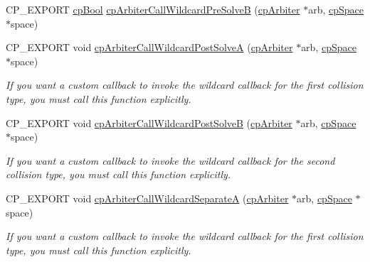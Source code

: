 \begin{DoxyCompactItemize}
\item 
C\+P\+\_\+\+E\+X\+P\+O\+RT \mbox{\hyperlink{group__basic_types_gabc5e752c48f3449ca26ef413ecbd647e}{cp\+Bool}} \mbox{\hyperlink{group__cp_arbiter_ga61954fc86039826a56e504f483ebe8a6}{cp\+Arbiter\+Call\+Wildcard\+Pre\+SolveB}} (\mbox{\hyperlink{structcp_arbiter}{cp\+Arbiter}} $\ast$arb, \mbox{\hyperlink{structcp_space}{cp\+Space}} $\ast$space)
\item 
\mbox{\label{group__cp_arbiter_gab5cc72090ced7919e12768dcee35e046}} 
C\+P\+\_\+\+E\+X\+P\+O\+RT void \mbox{\hyperlink{group__cp_arbiter_gab5cc72090ced7919e12768dcee35e046}{cp\+Arbiter\+Call\+Wildcard\+Post\+SolveA}} (\mbox{\hyperlink{structcp_arbiter}{cp\+Arbiter}} $\ast$arb, \mbox{\hyperlink{structcp_space}{cp\+Space}} $\ast$space)
\begin{DoxyCompactList}\small\item\em If you want a custom callback to invoke the wildcard callback for the first collision type, you must call this function explicitly. \end{DoxyCompactList}\item 
\mbox{\label{group__cp_arbiter_gad32bdc2f19665e8eaff4323381a07ab3}} 
C\+P\+\_\+\+E\+X\+P\+O\+RT void \mbox{\hyperlink{group__cp_arbiter_gad32bdc2f19665e8eaff4323381a07ab3}{cp\+Arbiter\+Call\+Wildcard\+Post\+SolveB}} (\mbox{\hyperlink{structcp_arbiter}{cp\+Arbiter}} $\ast$arb, \mbox{\hyperlink{structcp_space}{cp\+Space}} $\ast$space)
\begin{DoxyCompactList}\small\item\em If you want a custom callback to invoke the wildcard callback for the second collision type, you must call this function explicitly. \end{DoxyCompactList}\item 
\mbox{\label{group__cp_arbiter_gae49f69b06593a6fb3b50929bb6ba9cb7}} 
C\+P\+\_\+\+E\+X\+P\+O\+RT void \mbox{\hyperlink{group__cp_arbiter_gae49f69b06593a6fb3b50929bb6ba9cb7}{cp\+Arbiter\+Call\+Wildcard\+SeparateA}} (\mbox{\hyperlink{structcp_arbiter}{cp\+Arbiter}} $\ast$arb, \mbox{\hyperlink{structcp_space}{cp\+Space}} $\ast$space)
\begin{DoxyCompactList}\small\item\em If you want a custom callback to invoke the wildcard callback for the first collision type, you must call this function explicitly. \end{DoxyCompactList}\item 

\end{DoxyCompactItemize}
